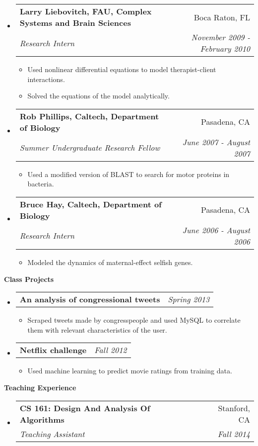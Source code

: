 \documentclass[letterpaper,11pt]{article}
\makeatletter
\newcommand{\resitem}[1]{\item #1 \vspace{-2pt}}
\newcommand{\resheading}[1]{{\large \colorbox{mygrey}{\begin{minipage}{\textwidth}{\textbf{#1 \vphantom{p\^{E}}}}\end{minipage}}}}
\newcommand{\ressubheadingnoloc}[4]{
\begin{tabular*}{7.0in}{l@{\extracolsep{\fill}}r}
		\textbf{#1} & \textit{#4} \\
\end{tabular*}\vspace{-6pt}}
\newcommand{\ressubheading}[4]{
\begin{tabular*}{7.0in}{l@{\extracolsep{\fill}}r}
		\textbf{#1} & #2 \\
		\textit{#3} & \textit{#4}\\
\end{tabular*}\vspace{-6pt}}
\makeatother
\begin{document}
\begin{itemize}
\item
	\ressubheading{Larry Liebovitch, FAU, Complex Systems and Brain Sciences}{Boca Raton, FL}{Research Intern}{November 2009 - February 2010}
	\begin{itemize}
		\resitem{Used nonlinear differential equations to model therapist-client interactions.}
		\resitem{Solved the equations of the model analytically.}
	\end{itemize}


\item
	\ressubheading{Rob Phillips, Caltech, Department of Biology}{Pasadena, CA}{Summer Undergraduate Research Fellow}{June 2007 - August 2007}
	\begin{itemize}
		\resitem{Used a modified version of BLAST to search for motor proteins in bacteria.}
	\end{itemize}

\item
	\ressubheading{Bruce Hay, Caltech, Department of Biology}{Pasadena, CA}{Research Intern}{June 2006 - August 2006}
	\begin{itemize}
		\resitem{Modeled the dynamics of maternal-effect selfish genes.}
	\end{itemize}

\end{itemize}

\resheading{Class Projects}
\begin{itemize}
\item
	\ressubheadingnoloc{An analysis of congressional tweets}{Pasadena, CA}{Student}{Spring 2013}
		\begin{itemize}
		\resitem{Scraped tweets made by congresspeople and used MySQL to correlate them with relevant characteristics of the user.}
	\end{itemize}
\item
	\ressubheadingnoloc{Netflix challenge}{Pasadena, CA}{Student}{Fall 2012}
	\begin{itemize}
		\resitem{Used machine learning to predict movie ratings from training data.}
	\end{itemize}
\end{itemize}

\resheading{Teaching Experience}
\begin{itemize}
\item
	\ressubheading{CS 161: Design And Analysis Of Algorithms}{Stanford, CA}{Teaching Assistant}{Fall 2014}
\end{itemize}
\end{document}
